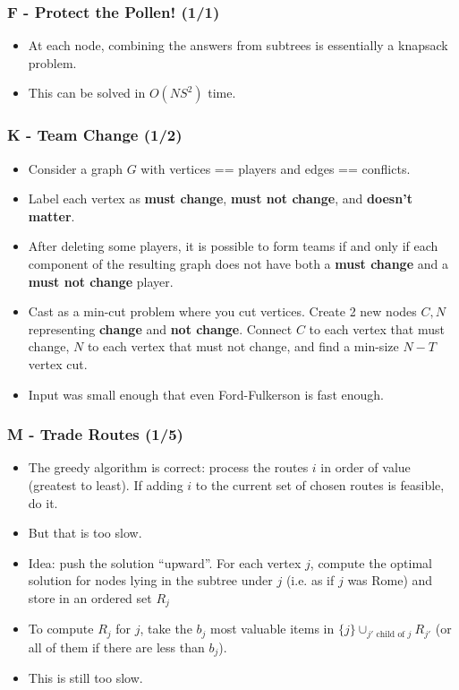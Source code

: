 \documentclass{beamer}
\begin{document}
\begin{frame}
\frametitle{F - Protect the Pollen! (1/1)}
\begin{itemize}
  \setlength\itemsep{0.5\baselineskip}
\item At each node, combining the answers from subtrees is essentially
  a knapsack problem.
\item This can be solved in $O(N S^2)$ time.
\end{itemize}
\end{frame}



\begin{frame}
\frametitle{K - Team Change (1/2)}
\begin{itemize}
  \setlength\itemsep{0.5\baselineskip}
  \item Consider a graph $G$ with vertices == players and edges == conflicts.
  \item Label each vertex as {\bf must change}, {\bf must not change}, and {\bf doesn't matter}.
  \item After deleting some players, it is possible to form teams if and only if each component of the resulting graph does not have both a {\bf must change} and a {\bf must not change} player.
  \item Cast as a min-cut problem where you cut vertices. Create 2 new nodes $C, N$ representing {\bf change} and {\bf not change}. Connect $C$ to each vertex that must change, $N$ to each vertex that must not change, and find a min-size
  $N-T$ vertex cut.
  \item Input was small enough that even Ford-Fulkerson is fast enough.
\end{itemize}
\end{frame}





\begin{frame}
\frametitle{M - Trade Routes (1/5)}
\begin{itemize}
\setlength\itemsep{0.5\baselineskip}
\item The greedy algorithm is correct: process the routes $i$ in order of value (greatest to least). If adding $i$ to the current set of chosen routes is feasible, do it.
\item But that is too slow.
\item Idea: push the solution ``upward''. For each vertex $j$, compute the optimal solution for nodes lying in the subtree under $j$ (i.e. as if $j$ was Rome) and store in an ordered set $R_j$
\item To compute $R_j$ for $j$, take the $b_j$ most valuable items in $\{j\} \cup_{j' \text{ child of } j} R_{j'}$ (or all of them if there are less than $b_j$).
\item This is still too slow.
\end{itemize}
\end{frame}
\end{document}
